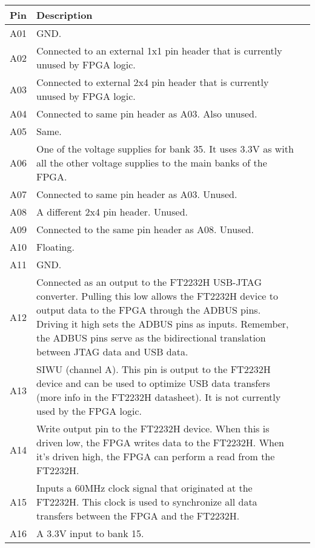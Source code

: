 \label{tab:xc7a15t-ftg256-pinout}
\begin{tabularx}{\textwidth}{c X>{\raggedright\arraybackslash}X}
        \caption{FPGA pinout. Displayed in alphanumeric order.} \\
        \toprule
        Pin & Description \\
        \midrule

        A01 & GND\@. \\
        A02 & Connected to an external 1x1 pin header that is currently unused by FPGA logic. \\
        A03 & Connected to external 2x4 pin header that is currently unused by FPGA logic. \\
        A04 & Connected to same pin header as A03. Also unused. \\
        A05 & Same. \\
        A06 & One of the voltage supplies for bank 35. It uses 3.3V as with all the other voltage supplies
        to the main banks of the FPGA\@. \\
        A07 & Connected to same pin header as A03. Unused. \\
        A08 & A different 2x4 pin header. Unused. \\
        A09 & Connected to the same pin header as A08. Unused. \\
        A10 & Floating. \\
        A11 & GND\@. \\
        A12 & Connected as an output to the FT2232H USB-JTAG converter. Pulling this low allows the
        FT2232H device to output data to the FPGA through the ADBUS pins. Driving it high sets the ADBUS
        pins as inputs. Remember, the ADBUS pins serve as the bidirectional translation between JTAG data
        and USB data. \\
        A13 & SIWU (channel A). This pin is output to the FT2232H device and can be used to optimize USB
        data transfers (more info in the FT2232H datasheet). It is not currently used by the FPGA
        logic. \\
        A14 & Write output pin to the FT2232H device. When this is driven low, the FPGA writes data to the
        FT2232H. When it's driven high, the FPGA can perform a read from the FT2232H. \\
        A15 & Inputs a 60MHz clock signal that originated at the FT2232H. This clock is used to
        synchronize all data transfers between the FPGA and the FT2232H. \\
        A16 & A 3.3V input to bank 15. \\


\end{tabularx}
